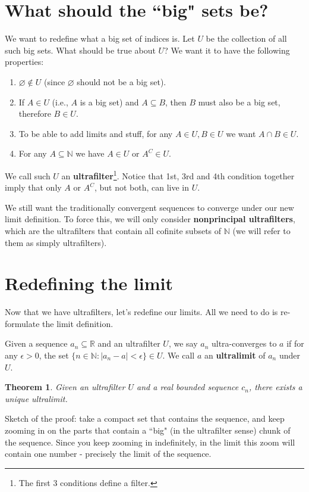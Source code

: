 \documentclass[12pt,reqno]{amsart}
\theoremstyle{plain} %
\newtheorem{theorem}{Theorem}[section]
\theoremstyle{remark}
\theoremstyle{definition}
\newcommand{\N}{\mathbb N}
\newcommand{\R}{\mathbb R}
\newcommand{\e}{\epsilon}
\begin{document}
\section{What should the ``big" sets be?}
We want to redefine what a big set of indices is. Let $U$ be the collection of all such big sets. What should be true about $U$? 
We want it to have the following properties: 
\begin{enumerate}
    \item $\varnothing \not\in U$ (since $\varnothing$ should not be a big set). 
    \item If $A \in U$ (i.e., $A$ is a big set) and $A\subseteq B$, then $B$ must also be a big set, therefore $B \in U$. 
    \item To be able to add limits and stuff, for any $A \in U, B \in U$ we want $A\cap B \in U$.
    \item For any $A \subseteq \N$ we have $A \in U$ or $A^C \in U$. 
\end{enumerate}
We call such $U$ an \textbf{ultrafilter}\footnote{The first 3 conditions define a filter.}.  
Notice that 1st, 3rd and 4th condition together imply that only $A$ or $A^C$, but not both, can live in $U$. 

We still want the traditionally convergent sequences to converge under our new limit definition. To force this, we will only consider \textbf{nonprincipal ultrafilters}, which are the ultrafilters that contain all cofinite subsets of $\N$ (we will refer to them as simply ultrafilters). 

\section{Redefining the limit}
Now that we have ultrafilters, let's redefine our limits. All we need to do is re-formulate the limit definition. 

Given a sequence $a_n \subseteq \R$ and an ultrafilter $U$, we say $a_n$ ultra-converges to $a$ if for any $\e >0$, the set $\{n \in \N : |a_n-a|< \e \} \in U$. We call $a$ an \textbf{ultralimit} of $a_n$ under $U$.

\begin{theorem}
    Given an ultrafilter $U$ and a real bounded sequence $c_n$, there exists a unique ultralimit. 
\end{theorem}

Sketch of the proof: take a compact set that contains the sequence, and keep zooming in on the parts that contain a ``big" (in the ultrafilter sense) chunk of the sequence. Since you keep zooming in indefinitely, in the limit this zoom  will contain one number - precisely the limit of the sequence. 
\end{document}
